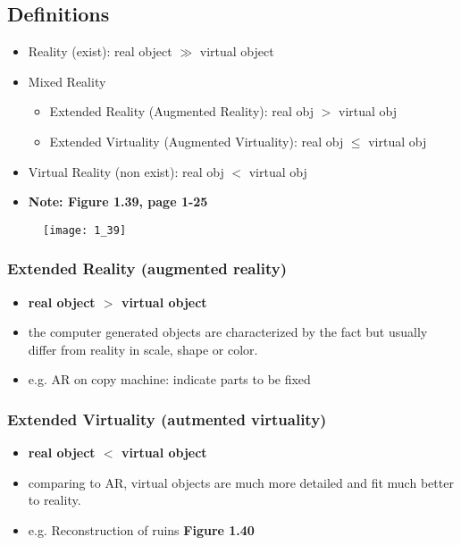 \documentclass{standalone}
\begin{document}
\subsection{Definitions}

\begin{itemize}
	\item Reality (exist): real object $\gg$ virtual object
	\item Mixed Reality 
		\begin{itemize}
			\item Extended Reality (Augmented Reality): real obj $>$ virtual obj
			\item Extended Virtuality (Augmented Virtuality): real obj $\leq$ virtual obj
		\end{itemize}
	\item Virtual Reality (non exist): real obj $<$ virtual obj
	\item \textbf{Note: Figure 1.39, page 1-25}
\end{itemize}

\begin{figure}[H]
	\centering
	\texttt{[image: 1\_39]}
\end{figure}

\subsubsection{Extended Reality (augmented reality)}

\begin{itemize}
	\item \textbf{real object $>$ virtual object}
	\item the computer generated objects are characterized by the fact but usually differ from reality in scale, shape or color.
	\item e.g. AR on copy machine: indicate parts to be fixed  
\end{itemize}

\subsubsection{Extended Virtuality (autmented virtuality)}

\begin{itemize}
	\item \textbf{real object $<$ virtual object}
	\item comparing to AR, virtual objects are much more detailed and fit much better to reality.
	\item e.g. Reconstruction of ruins \textbf{Figure 1.40}
\end{itemize}
\end{document}
